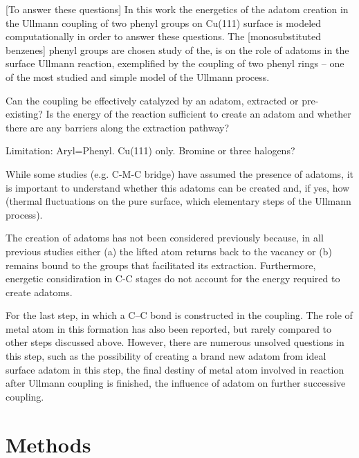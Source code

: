 \documentclass[%
 reprint,
 amsmath,amssymb,
 aps,
prb,
floatfix,
]{revtex4-2}
\newcommand{\lock}{\color{red}}
\newcommand{\lock}{\color{red}}
\newcommand{\comm}{\color{Purple}} %
\begin{document}
{\lock

[To answer these questions] In this work the energetics of the adatom creation in the Ullmann coupling of two phenyl groups on Cu(111) surface is modeled computationally in order to answer these questions. The [monosubstituted benzenes] phenyl groups are chosen study of the, is on the role of adatoms in the surface Ullmann reaction, exemplified by the coupling of two phenyl rings -- one of the most studied and simple model of the Ullmann process.

Can the coupling be effectively catalyzed by an adatom, extracted or pre-existing? Is the energy of the reaction sufficient to create an adatom and whether there are any barriers along the extraction pathway?

Limitation: Aryl=Phenyl. Cu(111) only. Bromine or three halogens? 


While some studies (e.g. C-M-C bridge) have assumed the presence of adatoms, it is important to understand whether this adatoms can be created and, if yes, how (thermal fluctuations on the pure surface, which elementary steps of the Ullmann process).

The creation of adatoms has not been considered previously because, in all previous studies either (a) the lifted atom returns back to the vacancy or (b) remains bound to the groups that facilitated its extraction. Furthermore, energetic considiration in C-C stages do not account for the energy required to create adatoms.

}

{\color{blue} 

For the last step, in which a C--C bond is constructed in the coupling. The role of metal atom in this formation has also been reported, but rarely compared to other steps discussed above. However, there are numerous unsolved questions in this step, such as the possibility of creating a brand new adatom from ideal surface adatom in this step, the final destiny of metal atom involved in reaction after Ullmann coupling is finished, the influence of adatom on further successive coupling.

}

\section{Methods}
\end{document}
